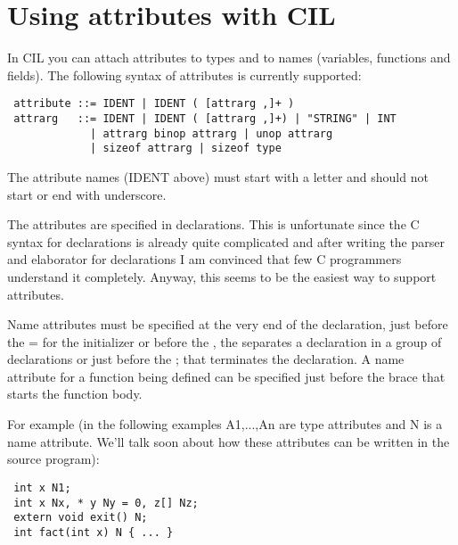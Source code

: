 \documentclass{book}
\begin{document}
\chapter{Using attributes with CIL}

 In CIL you can attach attributes to types and to names (variables, functions
and fields). The following syntax of attributes is currently supported: 

\begin{verbatim}
 attribute ::= IDENT | IDENT ( [attrarg ,]+ )
 attrarg   ::= IDENT | IDENT ( [attrarg ,]+) | "STRING" | INT
             | attrarg binop attrarg | unop attrarg
             | sizeof attrarg | sizeof type
\end{verbatim}

 The attribute names (IDENT above) must start with a letter and should not
start or end with underscore.

 The attributes are specified in declarations. This is unfortunate since the C
syntax for declarations is already quite complicated and after writing the
parser and elaborator for declarations I am convinced that few C programmers
understand it completely. Anyway, this seems to be the easiest way to support
attributes. 

 Name attributes must be specified at the very end of the declaration, just
before the = for the initializer or before the , the separates a declaration
in a group of declarations or just before the ; that terminates the
declaration. A name attribute for a function being defined can be specified
just before the brace that starts the function body. 

 For example (in the following examples A1,...,An are type attributes and N
  is a name attribute. We'll talk soon about how these attributes can be
  written in the source program): 

\begin{verbatim}
 int x N1;
 int x Nx, * y Ny = 0, z[] Nz;
 extern void exit() N;
 int fact(int x) N { ... }
\end{verbatim}
\end{document}
